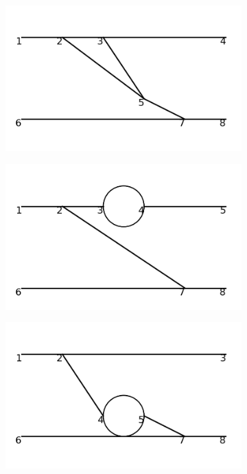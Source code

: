 \documentclass[11pt,a4paper,twoside,pdf]{article}
\numberwithin{equation}{section}
\begin{document}
\begin{figure}[h!]
\begin{subfigure}[t]{0.16\textwidth}
    \end{subfigure}
    \hfill
    \begin{subfigure}[t]{0.16\textwidth}
        \centering
        \includegraphics[width=\textwidth]{plots/order4_2to2/7.png}
    \end{subfigure}
    \hfill
    \begin{subfigure}[t]{0.16\textwidth}
        \centering
        \includegraphics[width=\textwidth]{plots/order4_2to2/8.png}
    \end{subfigure}
    \hfill 
    \begin{subfigure}[t]{0.16\textwidth}
        \centering
        \includegraphics[width=\textwidth]{plots/order4_2to2/9.png}

\end{subfigure}
\end{figure}
\end{document}
